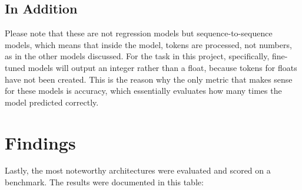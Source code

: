 \documentclass{article}
\begin{document}
\subsection{In Addition}
Please note that these are not regression models but sequence-to-sequence models, which means that inside the model, tokens are processed, not numbers, as in the other models discussed. For the task in this project, specifically, fine-tuned models will output an integer rather than a float, because tokens for floats have not been created. This is the reason why the only metric that makes sense for these models is accuracy, which essentially evaluates how many times the model predicted correctly.

\newpage

\section{Findings}
Lastly, the most noteworthy architectures were evaluated and scored on a benchmark. The results were documented in this table: 
\\[0.5em]
\end{document}
